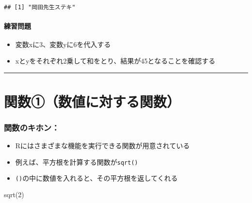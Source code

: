 \documentclass[
]{book}
\newenvironment{Shaded}{\begin{snugshade}}{\end{snugshade}}
\newcommand{\DecValTok}[1]{\textcolor[rgb]{0.00,0.00,0.81}{#1}}
\newcommand{\FunctionTok}[1]{\textcolor[rgb]{0.00,0.00,0.00}{#1}}
\newcommand{\NormalTok}[1]{#1}
\providecommand{\tightlist}{%
  \setlength{\itemsep}{0pt}\setlength{\parskip}{0pt}}
\begin{document}
\begin{verbatim}
## [1] "岡田先生ステキ"
\end{verbatim}

\hypertarget{ux7df4ux7fd2ux554fux984c}{%
\paragraph*{練習問題}\label{ux7df4ux7fd2ux554fux984c}}

\begin{itemize}
\tightlist
\item
  変数xに3、変数yに6を代入する
\item
  xとyをそれぞれ2乗して和をとり、結果が45となることを確認する
\end{itemize}

\begin{center}\rule{0.5\linewidth}{0.5pt}\end{center}

\hypertarget{ux95a2ux6570ux2460ux6570ux5024ux306bux5bfeux3059ux308bux95a2ux6570}{%
\section{関数①（数値に対する関数）}\label{ux95a2ux6570ux2460ux6570ux5024ux306bux5bfeux3059ux308bux95a2ux6570}}

\hypertarget{ux95a2ux6570ux306eux30adux30dbux30f3}{%
\subsubsection*{関数のキホン：}\label{ux95a2ux6570ux306eux30adux30dbux30f3}}

\begin{itemize}
\tightlist
\item
  Rにはさまざまな機能を実行できる関数が用意されている
\item
  例えば、平方根を計算する関数が\texttt{sqrt()}
\item
  \texttt{()}の中に数値を入れると、その平方根を返してくれる
\end{itemize}

\begin{Shaded}
\begin{Highlighting}[]
\FunctionTok{sqrt}\NormalTok{(}\DecValTok{2}\NormalTok{)}
\end{Highlighting}
\end{Shaded}
\end{document}
